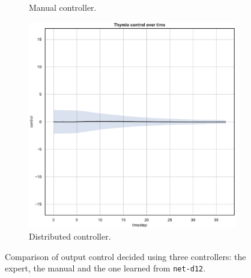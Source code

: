 \begin{figure}[!htb]
\begin{subfigure}[h]{0.3\textwidth}
		\caption{Manual controller.}
	\end{subfigure}
	\hfill
	\begin{subfigure}[h]{0.3\textwidth}
		\centering
		\includegraphics[width=\textwidth]{contents/images/net-d12/control-overtime-learned_distributed}
		\caption{Distributed controller.}
	\end{subfigure}
	\caption[Evaluation of the control decided by \texttt{net-d12}.]{Comparison of 
	output control decided using three controllers: the expert, the manual and the 
	one learned from \texttt{net-d12}.}
	\label{fig:net-d12control}
\end{figure}

